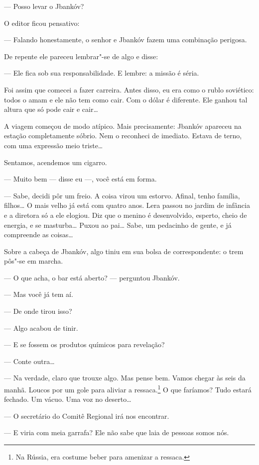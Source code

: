 --- Posso levar o Jbankóv?

O editor ficou pensativo:

--- Falando honestamente, o senhor e Jbankóv fazem uma combinação
perigosa.

De repente ele pareceu lembrar"-se de algo e disse:

--- Ele fica sob sua responsabilidade. E lembre: a missão é
séria.

Foi assim que comecei a fazer carreira. Antes disso, eu era como o rublo
soviético: todos o amam e ele não tem como cair. Com o dólar é
diferente. Ele ganhou tal altura que só pode cair e cair\ldots{}

A viagem começou de modo atípico. Mais precisamente: Jbankóv apareceu na
estação completamente sóbrio. Nem o reconheci de imediato. Estava de
terno, com uma expressão meio triste\ldots{}

Sentamos, acendemos um cigarro.

--- Muito bem --- disse eu ---, você está em forma.

--- Sabe, decidi pôr um freio. A coisa virou um estorvo. Afinal,
tenho família, filhos\ldots{} O mais velho já está com quatro anos. Lera
passou no jardim de infância e a diretora só a ele elogiou. Diz que o
menino é desenvolvido, esperto, cheio de energia, e se masturba\ldots{} Puxou
ao pai\ldots{} Sabe, um pedacinho de gente, e já compreende as coisas\ldots{}

Sobre a cabeça de Jbankóv, algo tiniu em sua bolsa de correspondente: o
trem pôs"-se em marcha.

--- O que acha, o bar está aberto? --- perguntou Jbankóv.

--- Mas você já tem aí.

--- De onde tirou isso?

--- Algo acabou de tinir.

--- E se fossem os produtos químicos para revelação?

--- Conte outra\ldots{}

--- Na verdade, claro que trouxe algo. Mas pense bem. Vamos
chegar às seis da manhã. Loucos por um gole para aliviar a ressaca.\footnote{Na Rússia, era costume beber para amenizar a ressaca.} O
que faríamos? Tudo estará fechado. Um vácuo. Uma voz no deserto\ldots{}

--- O secretário do Comitê Regional irá nos encontrar.

--- E viria com meia garrafa? Ele não sabe que laia de pessoas
somos nós.

